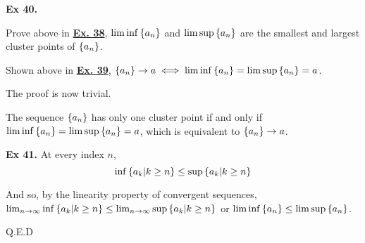 \noindent \textbf{Ex 40.}

Prove above in \underline{\textbf{Ex. 38}}, $\liminf\left\{a_n\right\}$ and $\limsup\left\{a_n\right\}$ are the smallest and largest cluster points of $\left\{a_n\right\}$.

Shown above in \underline{\textbf{Ex. 39}}, $\left\{a_n\right\}\to a \iff \liminf\left\{a_n\right\} = \limsup\left\{a_n\right\} = a$.

The proof is now trivial.

The sequence $\left\{a_n\right\}$ has only one cluster point if and only if $\liminf\left\{a_n\right\} = \limsup\left\{a_n\right\} = a$, which is equivalent to $\left\{a_n\right\} \to a$.

\noindent \textbf{Ex 41.}
At every index $n$,
\[ \inf\left\{a_k | k \geq n\right\} \leq \sup\left\{a_k | k \geq n\right\} \]

And so, by the linearity property of convergent sequences, $\lim_{n\to\infty}\inf\left\{a_k | k \geq n\right\} \leq \lim_{n\to\infty}\sup\left\{a_k | k \geq n\right\}$ or $\liminf\left\{a_n\right\} \leq \limsup\left\{a_n\right\}$.

Q.E.D


